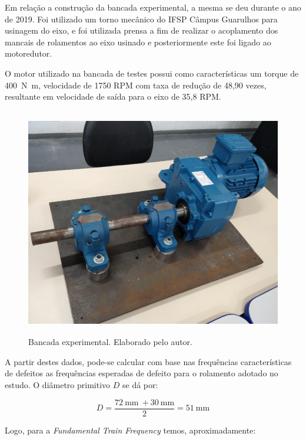 \documentclass[
	12pt,				
	oneside,			
	a4paper,			
	english,			
	brazil,			
	]{abntex2ppgsi}
\begin{document}
Em relação a construção da bancada experimental, a mesma se deu durante o ano de 2019. Foi utilizado um torno mecânico do IFSP Câmpus Guarulhos para usinagem do eixo, e foi utilizada prensa a fim de realizar o acoplamento dos mancais de rolamentos ao eixo usinado e posteriormente este foi ligado ao motoredutor. 

O motor utilizado na bancada de testes possui como características um torque de \SI{400}{\newton\metre}, velocidade de 1750 RPM com taxa de redução de 48,90 vezes, resultante em velocidade de saída para o eixo de 35,8 RPM.  

\begin{figure}[H]
\centering
\includegraphics[width=\textwidth,height=100mm,keepaspectratio]{bancada_de_testes}
\caption {Bancada experimental. Elaborado pelo autor.}
\label{bancada_de_testes}
\end{figure}

A partir destes dados, pode-se calcular com base nas frequências características de defeitos as frequências esperadas de defeito para o rolamento adotado no estudo. O diâmetro primitivo $D$ se dá por: 

\begin{equation}
	D = \frac{\SI{72}{\mm} \ + \SI{30}{\mm}}{2} = \SI{51}{\mm}
	\label{eq: Diametro Primitivo no Rolamento}
\end{equation}



Logo, para a \textit{Fundamental Train Frequency} temos, aproximadamente:
\end{document}
